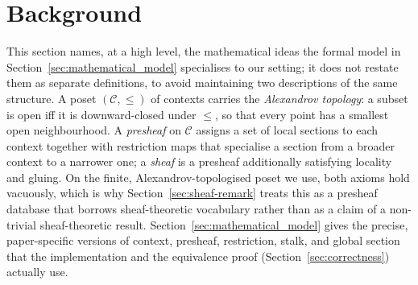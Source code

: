 \section{Background}
\label{sec:background}

This section names, at a high level, the mathematical ideas the formal
model in Section~\ref{sec:mathematical_model} specialises to our setting;
it does not restate them as separate definitions, to avoid maintaining two
descriptions of the same structure. A poset $(\mathcal{C}, \leq)$ of
contexts carries the \emph{Alexandrov topology}: a subset is open iff it is
downward-closed under $\leq$, so that every point has a smallest open
neighbourhood. A \emph{presheaf} on $\mathcal{C}$ assigns a set of local
sections to each context together with restriction maps that specialise a
section from a broader context to a narrower one; a \emph{sheaf} is a
presheaf additionally satisfying locality and gluing. On the finite,
Alexandrov-topologised poset we use, both axioms hold vacuously, which is
why Section~\ref{sec:sheaf-remark} treats this as a presheaf database that
borrows sheaf-theoretic vocabulary rather than as a claim of a non-trivial
sheaf-theoretic result. Section~\ref{sec:mathematical_model} gives the
precise, paper-specific versions of context, presheaf, restriction, stalk,
and global section that the implementation and the equivalence proof
(Section~\ref{sec:correctness}) actually use.
